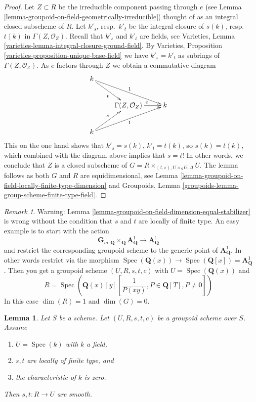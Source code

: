 \documentclass{stacks-project}
\theoremstyle{plain}
\newtheorem{lemma}[subsection]{Lemma}
\theoremstyle{definition}
\theoremstyle{remark}
\newtheorem{remark}[subsection]{Remark}
\numberwithin{equation}{subsection}
\def\Spec{\mathop{\mathrm{Spec}}}
\begin{document}
\begin{proof}
Let $Z \subset R$ be the irreducible component passing through $e$ (see
Lemma \ref{lemma-groupoid-on-field-geometrically-irreducible})
thought of as an integral closed subscheme of $R$.
Let $k'_s$, resp.\ $k'_t$ be the integral closure of
$s(k)$, resp.\ $t(k)$ in $\Gamma(Z, \mathcal{O}_Z)$.
Recall that $k'_s$ and $k'_t$ are fields, see
Varieties, Lemma \ref{varieties-lemma-integral-closure-ground-field}.
By
Varieties, Proposition \ref{varieties-proposition-unique-base-field}
we have $k'_s = k'_t$ as subrings of $\Gamma(Z, \mathcal{O}_Z)$.
As $e$ factors through $Z$ we obtain a commutative diagram
$$
\xymatrix{
k \ar[rd]_t \ar[rrd]^1 \\
& \Gamma(Z, \mathcal{O}_Z) \ar[r]^e & k \\
k \ar[ru]^s \ar[rru]_1
}
$$
This on the one hand shows that $k'_s = s(k)$, $k'_t = t(k)$, so
$s(k) = t(k)$, which combined with the diagram above implies
that $s = t$! In other words, we conclude that $Z$ is a closed
subscheme of $G = R \times_{(t, s), U \times_S U, \Delta} U$.
The lemma follows as both $G$ and $R$ are equidimensional, see
Lemma \ref{lemma-groupoid-on-field-locally-finite-type-dimension} and
Groupoids, Lemma \ref{groupoids-lemma-group-scheme-finite-type-field}.
\end{proof}

\begin{remark}
\label{remark-warn-dimension-groupoid-on-field}
Warning:
Lemma \ref{lemma-groupoid-on-field-dimension-equal-stabilizer}
is wrong without the condition that $s$ and $t$ are locally of
finite type.
An easy example is to start with the action
$$
\mathbf{G}_{m, \mathbf{Q}} \times_{\mathbf{Q}} \mathbf{A}^1_{\mathbf{Q}}
\to \mathbf{A}^1_{\mathbf{Q}}
$$
and restrict the corresponding groupoid scheme to the generic point of
$\mathbf{A}^1_{\mathbf{Q}}$. In other words restrict via the morphism
$\Spec(\mathbf{Q}(x)) \to
\Spec(\mathbf{Q}[x]) = \mathbf{A}^1_{\mathbf{Q}}$.
Then you get a groupoid scheme
$(U, R, s, t, c)$ with
$U = \Spec(\mathbf{Q}(x))$
and
$$
R = \Spec\left(
\mathbf{Q}(x)[y]\left[
\frac{1}{P(xy)}, P \in \mathbf{Q}[T], P \not = 0
\right]
\right)
$$
In this case $\dim(R) = 1$ and $\dim(G) = 0$.
\end{remark}

\begin{lemma}
\label{lemma-groupoid-characteristic-zero-smooth}
Let $S$ be a scheme. Let $(U, R, s, t, c)$ be a groupoid scheme
over $S$. Assume
\begin{enumerate}
\item $U = \Spec(k)$ with $k$ a field,
\item $s, t$ are locally of finite type, and
\item the characteristic of $k$ is zero.
\end{enumerate}
Then $s, t : R \to U$ are smooth.
\end{lemma}
\end{document}
